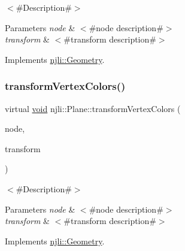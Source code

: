 $<$\#\+Description\#$>$


\begin{DoxyParams}{Parameters}
{\em node} & $<$\#node description\#$>$ \\
\hline
{\em transform} & $<$\#transform description\#$>$ \\
\hline
\end{DoxyParams}


Implements \mbox{\hyperlink{classnjli_1_1_geometry_a8ffb29f40c6f175f83cc36568feb87c4}{njli\+::\+Geometry}}.

\mbox{\label{classnjli_1_1_plane_a918065b54d466a43fe4c56688a9f0ee2}} 
\subsubsection{\texorpdfstring{transform\+Vertex\+Colors()}{transformVertexColors()}}
{\footnotesize\ttfamily virtual \mbox{\hyperlink{_thread_8h_af1e856da2e658414cb2456cb6f7ebc66}{void}} njli\+::\+Plane\+::transform\+Vertex\+Colors (\begin{DoxyParamCaption}\item[{\mbox{\hyperlink{classnjli_1_1_node}{Node}} $\ast$}]{node,  }\item[{const bt\+Transform \&}]{transform }\end{DoxyParamCaption})\hspace{0.3cm}{\ttfamily [virtual]}}

$<$\#\+Description\#$>$


\begin{DoxyParams}{Parameters}
{\em node} & $<$\#node description\#$>$ \\
\hline
{\em transform} & $<$\#transform description\#$>$ \\
\hline
\end{DoxyParams}


Implements \mbox{\hyperlink{classnjli_1_1_geometry_a1169257a4241392cec0a23c922f148f3}{njli\+::\+Geometry}}.

\mbox{\label{classnjli_1_1_plane_aeb45c844627228083af4f2dd4d6b5010}} 
